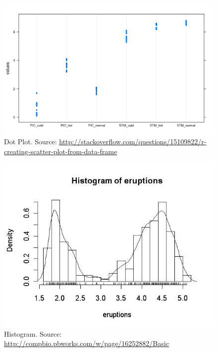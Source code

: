 \documentclass[12pt,a4paper]{report}
\begin{document}
 
\begin{figure}
\centering
\includegraphics[height=0.3\textheight]{art/lmCm0}
\caption[Dot Plot]{Dot Plot. Source: \url{http://stackoverflow.com/questions/15109822/r-creating-scatter-plot-from-data-frame}}
\label{fig:dot_plot}
\end{figure}



\begin{figure}
\centering
\includegraphics[height=0.3\textheight]{art/histogram_eruptions}
\caption[Histogram]{Histogram. Source: \url{http://compbio.pbworks.com/w/page/16252882/Basic}}
\label{fig:histogram_eruptions}
\end{figure}
\end{document}
